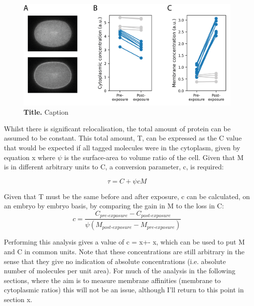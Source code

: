 \documentclass[12pt]{"article"}
\newcommand{\mycaption}[2]{\caption[#1]{\textbf{#1.} #2}}
\begin{document}
\begin{figure}[!h]
\includegraphics[scale=1]{memquant_optogenetics}
\setlength{\abovecaptionskip}{20pt}
\centering
\mycaption{Title}{Caption}
\end{figure}


Whilst there is significant relocalisation, the total amount of protein can be assumed to be constant. This total amount, T, can be expressed as the C value that would be expected if all tagged molecules were in the cytoplasm, given by equation x where $\psi$ is the surface-area to volume ratio of the cell. Given that M is in different arbitrary units to C, a conversion parameter, c, is required:

\begin{equation}
\tau = C + \psi c M
\label{eq:T}
\end{equation}

Given that T must be the same before and after exposure, c can be calculated, on an embryo by embryo basis, by comparing the gain in M to the loss in C:\\

\begin{equation}
c = \frac{C_{pre \textrm{-} exposure} - C_{post  \textrm{-} exposure}}{\psi (M_{post  \textrm{-} exposure} - M_{pre  \textrm{-} exposure})}
\label{eq:c}
\end{equation}

Performing this analysis gives a value of c = x+- x, which can be used to put M and C in common units. Note that these concentrations are still arbitrary in the sense that they give no indication of absolute concentrations (i.e. absolute number of molecules per unit area). For much of the analysis in the following sections, where the aim is to measure membrane affinities (membrane to cytoplasmic ratios) this will not be an issue, although I’ll return to this point in section x.\\
\end{document}
